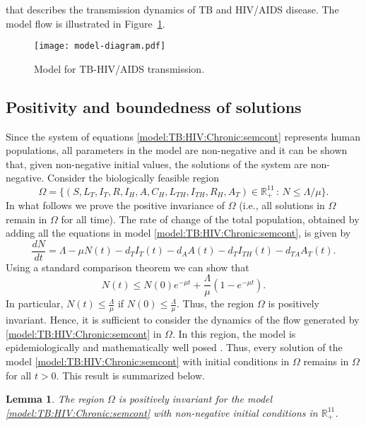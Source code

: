 \documentclass{my_aims}
\newtheorem{lemma}[theorem]{Lemma}
\theoremstyle{definition}
\begin{document}
that describes the transmission dynamics of TB and HIV/AIDS disease.
The model flow is illustrated in Figure~\ref{fig:model:flow}.
\begin{figure}
\centering
\texttt{[image: model-diagram.pdf]}
\caption{Model for TB-HIV/AIDS transmission.}
\label{fig:model:flow}
\end{figure}

\subsection{Positivity and boundedness of solutions}

Since the system of equations \eqref{model:TB:HIV:Chronic:semcont} represents human populations,
all parameters in the model are non-negative and it can be shown that, given non-negative
initial values, the solutions of the system are non-negative. Consider the biologically feasible region
\begin{equation*}
\Omega = \{ \left( S, L_T, I_T, R, I_H, A, C_H, L_{TH}, I_{TH}, R_H, A_T \right)
\in {\mathbb{R}}_+^{11} \, : \, N \leq \Lambda/\mu \}.
\end{equation*}
In what follows we prove the positive invariance of $\Omega$
(i.e., all solutions in $\Omega$ remain in $\Omega$ for all time).
The rate of change of the total population, obtained by adding all the equations
in model \eqref{model:TB:HIV:Chronic:semcont}, is given by
\begin{equation*}
\frac{dN}{dt} = \Lambda - \mu N(t) - d_T I_T(t) - d_A A(t) - d_T I_{TH}(t) - d_{TA} A_T(t).
\end{equation*}
Using a standard comparison theorem \cite{Lakshmikantham:1989} we can show that
$$
N(t) \leq N(0) e^{-\mu t} + \frac{\Lambda}{\mu} \left( 1- e^{-\mu t} \right).
$$
In particular, $N(t) \leq \frac{\Lambda}{\mu}$ if $N(0) \leq \frac{\Lambda}{\mu}$.
Thus, the region $\Omega$ is positively invariant. Hence, it is sufficient to consider
the dynamics of the flow generated by \eqref{model:TB:HIV:Chronic:semcont} in $\Omega$.
In this region, the model is epidemiologically and mathematically well posed \cite{Hethcote:2000}.
Thus, every solution of the model \eqref{model:TB:HIV:Chronic:semcont} with initial conditions
in $\Omega$ remains in $\Omega$ for all $t > 0$.
This result is summarized below.

\begin{lemma}
\label{lemma:posit:invariant:model:TB:HIV}
The region $\Omega$ is positively invariant for the model
\eqref{model:TB:HIV:Chronic:semcont} with non-negative initial conditions
in ${\mathbb{R}}^{11}_{+}$.
\end{lemma}
\end{document}
